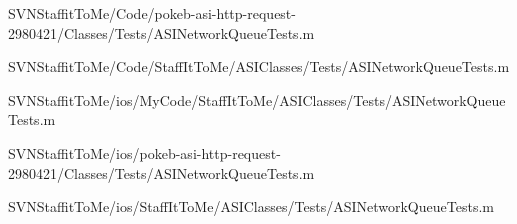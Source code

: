 \begin{DoxyCompactItemize}
\-S\-V\-N\-Staffit\-To\-Me/\-Code/pokeb-\/asi-\/http-\/request-\/2980421/\-Classes/\-Tests/\-A\-S\-I\-Network\-Queue\-Tests.\-m\item 
\-S\-V\-N\-Staffit\-To\-Me/\-Code/\-Staff\-It\-To\-Me/\-A\-S\-I\-Classes/\-Tests/\-A\-S\-I\-Network\-Queue\-Tests.\-m\item 
\-S\-V\-N\-Staffit\-To\-Me/ios/\-My\-Code/\-Staff\-It\-To\-Me/\-A\-S\-I\-Classes/\-Tests/\-A\-S\-I\-Network\-Queue\-Tests.\-m\item 
\-S\-V\-N\-Staffit\-To\-Me/ios/pokeb-\/asi-\/http-\/request-\/2980421/\-Classes/\-Tests/\-A\-S\-I\-Network\-Queue\-Tests.\-m\item 
\-S\-V\-N\-Staffit\-To\-Me/ios/\-Staff\-It\-To\-Me/\-A\-S\-I\-Classes/\-Tests/\-A\-S\-I\-Network\-Queue\-Tests.\-m\end{DoxyCompactItemize}
